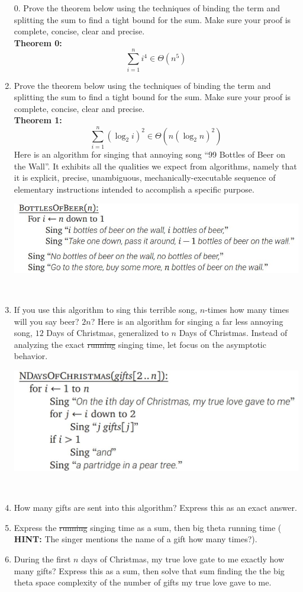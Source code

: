 \documentclass[12pt]{article}
\begin{document}
\begin{enumerate}
\item[0. ] Prove the theorem below using the techniques of binding the term and splitting the
sum to find a tight bound for the sum. Make sure your proof is complete, concise, clear
and precise.\\
\textbf{Theorem 0: }
$$\sum\limits_{i=1}^{n}i^4\in\Theta(n^5)$$
\newpage
\item Prove the theorem below using the techniques of binding the term and splitting the
sum to find a tight bound for the sum. Make sure your proof is complete, concise, clear
and precise.\\
\textbf{Theorem 1: }
$$\sum\limits_{i=1}^{n}(\log_2{i})^2\in\Theta(n(\log_2{n})^2)$$
\newpage
Here is an algorithm for singing that annoying song ``99 Bottles of Beer on the Wall''.
It exhibits all the qualities we expect from algorithms, namely that it is explicit, 
precise, unambiguous, mechanically-executable sequence of elementary instructions intended to 
accomplish a specific purpose.\\
\centerline{\includegraphics[scale = .6]{BoBeer.JPG}}\\
\item If you use this algorithm to sing this terrible song, $n$-times how many times will you say beer? $2n$? 
\newpage
Here is an algorithm for singing a far less annoying song, $12$ Days of Christmas, generalized to $n$ 
Days of Christmas. Instead of analyzing the exact \st{running} singing time, let focus on the asymptotic behavior. \\
\centerline{\includegraphics[scale = .5]{NDaysOfChristmas.JPG}}\\
\item How many gifts are sent into this algorithm? Express this as an exact answer.
\item Express the \st{running} singing time as a sum, then big theta running time ( 
\textbf{HINT: }The singer mentions the name of a gift how many times?).
\item During the first $n$ days of Christmas, my true love gate to me exactly how many gifts? Express 
this as a sum, then solve that sum finding the the big theta space complexity of the number of gifts my true love gave to me.
\end{enumerate}
\end{document}

